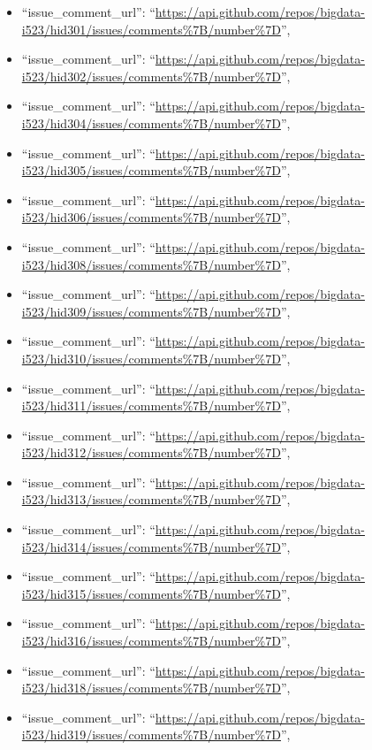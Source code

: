 \begin{itemize}
\item
  ``issue\_comment\_url'':
  ``\url{https://api.github.com/repos/bigdata-i523/hid301/issues/comments\%7B/number\%7D}'',
\item
  ``issue\_comment\_url'':
  ``\url{https://api.github.com/repos/bigdata-i523/hid302/issues/comments\%7B/number\%7D}'',
\item
  ``issue\_comment\_url'':
  ``\url{https://api.github.com/repos/bigdata-i523/hid304/issues/comments\%7B/number\%7D}'',
\item
  ``issue\_comment\_url'':
  ``\url{https://api.github.com/repos/bigdata-i523/hid305/issues/comments\%7B/number\%7D}'',
\item
  ``issue\_comment\_url'':
  ``\url{https://api.github.com/repos/bigdata-i523/hid306/issues/comments\%7B/number\%7D}'',
\item
  ``issue\_comment\_url'':
  ``\url{https://api.github.com/repos/bigdata-i523/hid308/issues/comments\%7B/number\%7D}'',
\item
  ``issue\_comment\_url'':
  ``\url{https://api.github.com/repos/bigdata-i523/hid309/issues/comments\%7B/number\%7D}'',
\item
  ``issue\_comment\_url'':
  ``\url{https://api.github.com/repos/bigdata-i523/hid310/issues/comments\%7B/number\%7D}'',
\item
  ``issue\_comment\_url'':
  ``\url{https://api.github.com/repos/bigdata-i523/hid311/issues/comments\%7B/number\%7D}'',
\item
  ``issue\_comment\_url'':
  ``\url{https://api.github.com/repos/bigdata-i523/hid312/issues/comments\%7B/number\%7D}'',
\item
  ``issue\_comment\_url'':
  ``\url{https://api.github.com/repos/bigdata-i523/hid313/issues/comments\%7B/number\%7D}'',
\item
  ``issue\_comment\_url'':
  ``\url{https://api.github.com/repos/bigdata-i523/hid314/issues/comments\%7B/number\%7D}'',
\item
  ``issue\_comment\_url'':
  ``\url{https://api.github.com/repos/bigdata-i523/hid315/issues/comments\%7B/number\%7D}'',
\item
  ``issue\_comment\_url'':
  ``\url{https://api.github.com/repos/bigdata-i523/hid316/issues/comments\%7B/number\%7D}'',
\item
  ``issue\_comment\_url'':
  ``\url{https://api.github.com/repos/bigdata-i523/hid318/issues/comments\%7B/number\%7D}'',
\item
  ``issue\_comment\_url'':
  ``\url{https://api.github.com/repos/bigdata-i523/hid319/issues/comments\%7B/number\%7D}'',

\end{itemize}
